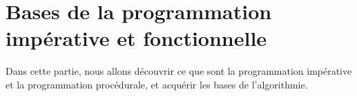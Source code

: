 \part{Bases de la programmation impérative et fonctionnelle}

Dans cette partie, nous allons découvrir ce que sont
la programmation impérative et la programmation procédurale,
et acquérir les bases de l’algorithmie.











